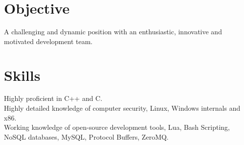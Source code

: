 \documentclass[margin]{res}
\begin{document}
 
 

\address{david.andrews112@gmail.com \ \ \ (949) 633-0588}


 
\begin{resume}  

\section{Objective}
A challenging and dynamic position with an enthusiastic, innovative and motivated development team.


\section{Skills}
\noindent
Highly proficient in C++ and C. \\
Highly detailed knowledge of computer security, Linux, Windows internals and x86. \\
Working knowledge of open-source development tools, Lua, Bash Scripting, NoSQL
databases, MySQL, Protocol Buffers, ZeroMQ.






\end{resume}
\end{document}
